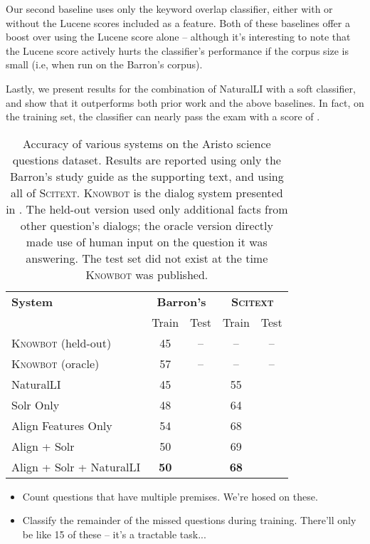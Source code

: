 Our second baseline uses only the keyword overlap classifier, either with or without
  the Lucene scores included as a feature.
Both of these baselines offer a boost over using the Lucene score alone -- although
  it's interesting to note that the Lucene score actively hurts the classifier's
  performance if the corpus size is small (i.e, when run on the Barron's corpus).

Lastly, we present results for the combination of NaturalLI with a soft classifier,
  and show that it outperforms both prior work and the above baselines.
In fact, on the training set, the classifier can nearly pass the exam with a score
  of .

%
%
\def\t#1{\small{#1}}
\def\b#1{\t{\textbf{#1}}}
\def\colspaceS{2.0mm}
\def\colspaceM{3.0mm}
\def\colspaceL{4.0mm}

\begin{table}
\begin{center}
\begin{tabular}{l@{\hskip \colspaceL}c@{\hskip \colspaceS}c@{\hskip \colspaceL}c@{\hskip \colspaceS}c}
\hline
\textbf{System} & \multicolumn{2}{c}{\textbf{Barron's}} & \multicolumn{2}{c}{\textbf{\textsc{Scitext}}} \\
 & Train & Test & Train & Test \\
\hline
\t{\textsc{Knowbot} (held-out)} & \t{45} & \t{--} & \t{--} & \t{--} \\
\t{\textsc{Knowbot} (oracle)}   & \t{57} & \t{--} & \t{--} & \t{--} \\
\hline                                                         
\t{NaturalLI}                   & \t{45} & \t{  } & \t{55} & \t{ } \\
\t{Solr Only}                   & \t{48} & \t{  } & \t{64} & \t{ } \\
\t{Align Features Only}         & \t{54} & \t{  } & \t{68} & \t{ } \\
\t{Align + Solr}                & \t{50} & \t{  } & \t{69} & \t{ } \\
\t{Align + Solr + NaturalLI}    & \b{50} & \b{  } & \b{68} & \b{ } \\
\hline
\end{tabular}
\end{center}
\caption{
\label{tab:aristonaturalli}
Accuracy of various systems on the Aristo science questions dataset.
Results are reported using only the Barron's study guide as the supporting
  text, and using all of \textsc{Scitext}.
\textsc{Knowbot} is the dialog system presented in .
The held-out version used only additional facts from other question's dialogs;
  the oracle version directly made use of human input on the question it was 
  answering.
The test set did not exist at the time \textsc{Knowbot} was published.
}
\end{table}
%
%

\dome
\begin{itemize}
\item Count questions that have multiple premises. We're hosed on these.
\item Classify the remainder of the missed questions during training.
      There'll only be like 15 of these -- it's a tractable task...
\end{itemize}

